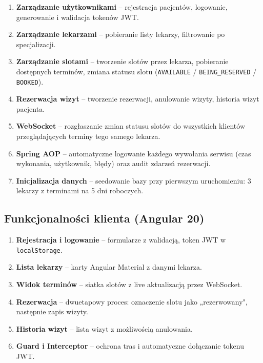 \documentclass[12pt, a4paper]{article}
\begin{document}
\begin{enumerate}[label=\arabic*.]
  \item \textbf{Zarządzanie użytkownikami} -- rejestracja pacjentów, logowanie, generowanie i walidacja tokenów JWT.
  \item \textbf{Zarządzanie lekarzami} -- pobieranie listy lekarzy, filtrowanie po specjalizacji.
  \item \textbf{Zarządzanie slotami} -- tworzenie slotów przez lekarza, pobieranie dostępnych terminów, zmiana statusu slotu (\texttt{AVAILABLE} / \texttt{BEING\_RESERVED} / \texttt{BOOKED}).
  \item \textbf{Rezerwacja wizyt} -- tworzenie rezerwacji, anulowanie wizyty, historia wizyt pacjenta.
  \item \textbf{WebSocket} -- rozgłaszanie zmian statusu slotów do wszystkich klientów przeglądających terminy tego samego lekarza.
  \item \textbf{Spring AOP} -- automatyczne logowanie każdego wywołania serwisu (czas wykonania, użytkownik, błędy) oraz audit zdarzeń rezerwacji.
  \item \textbf{Inicjalizacja danych} -- seedowanie bazy przy pierwszym uruchomieniu: 3 lekarzy z terminami na 5 dni roboczych.
\end{enumerate}

\subsection{Funkcjonalności klienta (Angular 20)}

\begin{enumerate}[label=\arabic*.]
  \item \textbf{Rejestracja i logowanie} -- formularze z walidacją, token JWT w \texttt{localStorage}.
  \item \textbf{Lista lekarzy} -- karty Angular Material z danymi lekarza.
  \item \textbf{Widok terminów} -- siatka slotów z live aktualizacją przez WebSocket.
  \item \textbf{Rezerwacja} -- dwuetapowy proces: oznaczenie slotu jako „rezerwowany", następnie zapis wizyty.
  \item \textbf{Historia wizyt} -- lista wizyt z możliwością anulowania.
  \item \textbf{Guard i Interceptor} -- ochrona tras i automatyczne dołączanie tokenu JWT.
\end{enumerate}

\end{document}
